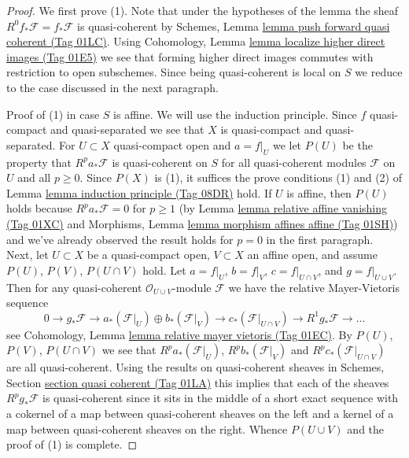 \documentclass{amsart}
\theoremstyle{plain}
\theoremstyle{definition}
\theoremstyle{remark}
\numberwithin{equation}{subsection}
\begin{document}
\begin{proof}
We first prove (1). Note that under the hypotheses of the lemma the sheaf
$R^0f_*\mathcal{F} = f_*\mathcal{F}$ is quasi-coherent by
Schemes, Lemma \href{https://stacks.math.columbia.edu/tag/01LC}{lemma push forward quasi coherent (Tag 01LC)}.
Using
Cohomology, Lemma \href{https://stacks.math.columbia.edu/tag/01E5}{lemma localize higher direct images (Tag 01E5)}
we see that forming higher direct images commutes with restriction
to open subschemes. Since being quasi-coherent is local on $S$ we
reduce to the case discussed in the next paragraph.

\medskip\noindent
Proof of (1) in case $S$ is affine. We will use the induction principle.
Since $f$ quasi-compact and quasi-separated we see that $X$
is quasi-compact and quasi-separated. For $U \subset X$
quasi-compact open and $a = f|_U$ we let $P(U)$ be the property that
$R^pa_*\mathcal{F}$ is quasi-coherent on $S$ for all quasi-coherent modules
$\mathcal{F}$ on $U$ and all $p \geq 0$. Since $P(X)$ is (1), it suffices
the prove conditions (1) and (2) of Lemma \href{https://stacks.math.columbia.edu/tag/08DR}{lemma induction principle (Tag 08DR)} hold.
If $U$ is affine, then $P(U)$ holds because $R^pa_*\mathcal{F} = 0$ for
$p \geq 1$ (by  Lemma \href{https://stacks.math.columbia.edu/tag/01XC}{lemma relative affine vanishing (Tag 01XC)} and
Morphisms, Lemma \href{https://stacks.math.columbia.edu/tag/01SH}{lemma morphism affines affine (Tag 01SH)})
and we've already observed the result holds for $p = 0$ in the first
paragraph. Next, let $U \subset X$ be a quasi-compact open, $V \subset X$
an affine open, and assume $P(U)$, $P(V)$, $P(U \cap V)$ hold.
Let $a = f|_U$, $b = f|_V$, $c = f|_{U \cap V}$, and $g = f|_{U \cup V}$.
Then for any quasi-coherent $\mathcal{O}_{U \cup V}$-module $\mathcal{F}$
we have the relative Mayer-Vietoris sequence
$$
0 \to
g_*\mathcal{F} \to
a_*(\mathcal{F}|_U) \oplus b_*(\mathcal{F}|_V) \to
c_*(\mathcal{F}|_{U \cap V}) \to
R^1g_*\mathcal{F} \to \ldots
$$
see Cohomology, Lemma \href{https://stacks.math.columbia.edu/tag/01EC}{lemma relative mayer vietoris (Tag 01EC)}.
By $P(U)$, $P(V)$, $P(U \cap V)$ we see that
$R^pa_*(\mathcal{F}|_U)$, $R^pb_*(\mathcal{F}|_V)$ and
$R^pc_*(\mathcal{F}|_{U \cap V})$ are all quasi-coherent.
Using the results on quasi-coherent sheaves in
Schemes, Section \href{https://stacks.math.columbia.edu/tag/01LA}{section quasi coherent (Tag 01LA)}
this implies that each of the sheaves
$R^pg_*\mathcal{F}$ is quasi-coherent since it sits in the middle of a short
exact sequence with a cokernel of a map between quasi-coherent sheaves
on the left and a kernel of a map between quasi-coherent sheaves on the right.
Whence $P(U \cup V)$ and the proof of (1) is complete.


\end{proof}
\end{document}
